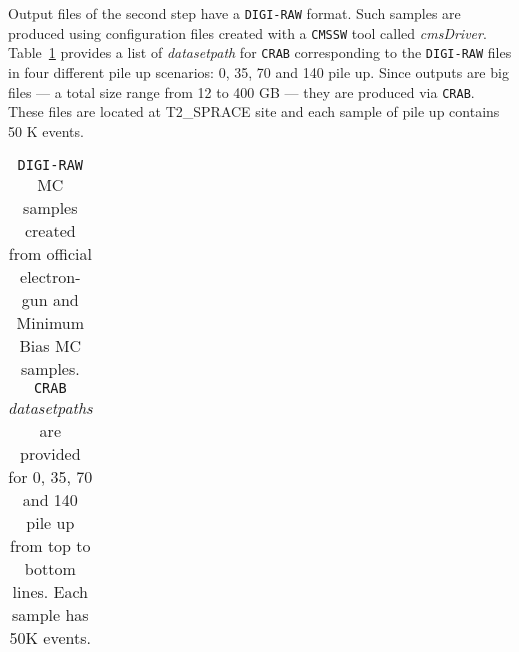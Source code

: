 \documentclass[a4paper,12pt,oneside]{article}
\begin{document}
                   Output files of the second step have a \texttt{DIGI-RAW} format. Such samples are produced using configuration
                   files created with a \texttt{CMSSW} tool called {\it cmsDriver}. Table~\ref{tab:digi-raw} provides a list of
                   {\it datasetpath} for \texttt{CRAB} corresponding to the \texttt{DIGI-RAW} files in four different pile up
                   scenarios: 0, 35, 70 and 140 pile up. Since outputs are big files --- a total size range from 12 to 400 GB ---
                   they are produced via \texttt{CRAB}. These files are located at T2\_SPRACE site and each sample of pile up
                   contains 50 K events.

                   \begin{table}[!htb]
                     \centering
                     \scriptsize
                     \caption{\texttt{DIGI-RAW} MC samples created from official electron-gun and Minimum Bias MC samples.
                       \texttt{CRAB} {\it datasetpaths} are provided for 0, 35, 70 and 140 pile up from top to bottom lines.
                       Each sample has 50K events.}
                     \label{tab:digi-raw}
                     \begin{tabular}{c}
\hline

\end{tabular}
\end{table}
\end{document}
